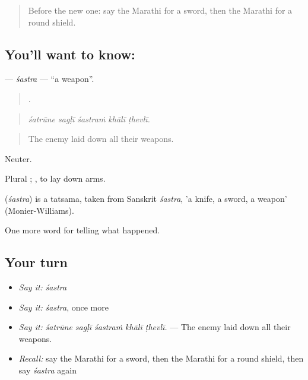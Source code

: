 \label{lesson:MR-C329-sastra}



\begin{quote}
Before the new one: say the Marathi for a sword, then the Marathi for a round shield.
\end{quote}

\subsection*{You'll want to know: }
\textbf{} — \emph{śastra} — \textquotedblleft{}a weapon\textquotedblright{}.

\begin{quote}
    .
\end{quote}

\begin{quote}
\emph{śatrūne sagḷī śastraṁ khālī ṭhevlī.}
\end{quote}

\begin{quote}
The enemy laid down all their weapons.
\end{quote}

Neuter.

Plural ;   , to lay down arms.

\begin{cousinweb}
\textbf{} (\emph{śastra}) is a tatsama, taken from Sanskrit \emph{śastra}, 'a knife, a sword, a weapon' (Monier-Williams).
\end{cousinweb}

\begin{grammarlens}[title={What you've built}]
One more word for telling what happened.
\end{grammarlens}

\subsection*{Your turn}
\begin{itemize}
\raggedright
  \item \emph{Say it:} \emph{śastra}
  \item \emph{Say it:} \emph{śastra}, once more
  \item \emph{Say it:} \emph{śatrūne sagḷī śastraṁ khālī ṭhevlī.} — The enemy laid down all their weapons.
  \item \emph{Recall:} say the Marathi for a sword, then the Marathi for a round shield, then say \emph{śastra} again
\end{itemize}


